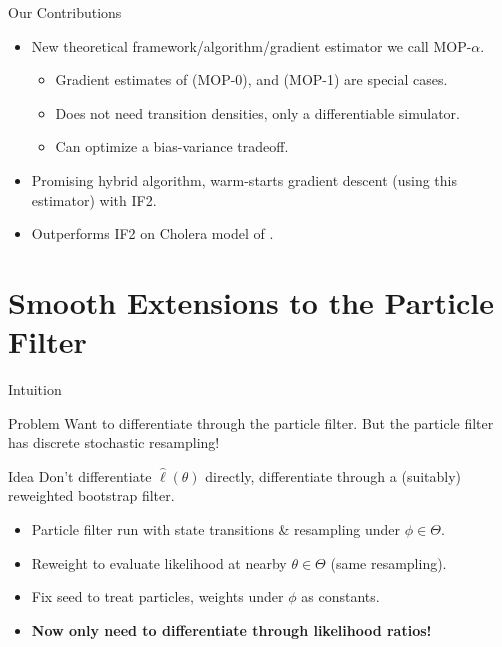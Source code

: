 \documentclass{beamer}
\begin{document}
\begin{frame}{Our Contributions}
    \begin{itemize}
        \item New theoretical framework/algorithm/gradient estimator we call MOP-$\alpha$.
        \begin{itemize}
            \item \pause Gradient estimates of \cite{blei2018vsmc} (MOP-0), \cite{poyiadjis11} and \cite{scibior2021dpf} (MOP-1) are special cases.
            \item \pause Does not need transition densities, only a differentiable simulator.
            \item \pause Can optimize a bias-variance tradeoff. 
        \end{itemize}
        \item \pause Promising hybrid algorithm, warm-starts gradient descent (using this estimator) with IF2.
        \item \pause Outperforms IF2 on Cholera model of \cite{king08}.
    \end{itemize}
\end{frame}


\section{Smooth Extensions to the Particle Filter}

\begin{frame}{Intuition}
    \begin{block}{Problem}
        Want to differentiate through the particle filter. But the particle filter has discrete stochastic resampling! 
    \end{block}
    \pause 
    \begin{block}{Idea}
        Don't differentiate $\hat\ell(\theta)$ directly, differentiate through a (suitably) reweighted bootstrap filter.
    \end{block}
    \begin{itemize}
        \item \pause Particle filter run with state transitions \& resampling under $\phi \in \Theta$. 
        \item \pause Reweight to evaluate likelihood at nearby $\theta \in \Theta$ (same resampling).
        \item \pause Fix seed to treat particles, weights under $\phi$ as constants.
        \item \pause \textbf{Now only need to differentiate through likelihood ratios!}
    \end{itemize}
\end{frame}
\end{document}
